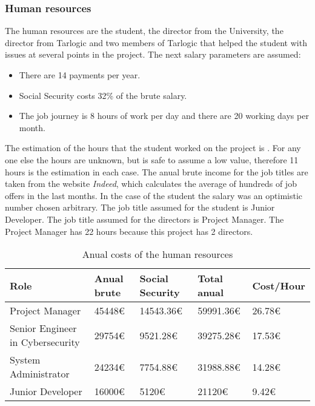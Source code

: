 \subsubsection{Human resources}
The human resources are the student, the director from the University, the director from Tarlogic and two members of Tarlogic that helped the student with issues at several points in the project.
\linej
\linej
The next salary parameters are assumed:
\begin{itemize}
	\item There are 14 payments per year.
	\item Social Security costs 32\% of the brute salary.
	\item The job journey is 8 hours of work per day and there are 20 working days per month.
\end{itemize}
\linej
The estimation of the hours that the student worked on the project is \projecthours.
For any one else the hours are unknown, but is safe to assume a low value, therefore 11 hours is the estimation in each case.
\linej
The anual brute income for the job titles are taken from the website \textit{Indeed}\cite{indeed}, which calculates the average of hundreds of job offers in the last months.
In the case of the student the salary was an optimistic number chosen arbitrary.
\linej
The job title assumed for the student is Junior Developer.
The job title assumed for the directors is Project Manager.
The Project Manager has 22 hours because this project has 2 directors.
\linej
\begin{table}[H]
	\begin{tabularx}{\textwidth}{|X|l|l|l|l|}
		\hline
		\rowcolor{gray!30}
		Role                             & Anual brute &  Social Security &    Total anual & Cost/Hour\\ \hline
		Project Manager                  & 45448\euro{}&   14543.36\euro{}& 59991.36\euro{}& 26.78\euro{}\\ \hline
		Senior Engineer in Cybersecurity & 29754\euro{}&    9521.28\euro{}& 39275.28\euro{}& 17.53\euro{}\\ \hline
		System Administrator             & 24234\euro{}&    7754.88\euro{}& 31988.88\euro{}& 14.28\euro{}\\ \hline
		Junior Developer                 & 16000\euro{}&       5120\euro{}&    21120\euro{}& 9.42\euro{}\\ \hline
	\end{tabularx}
	\caption{Anual costs of the human resources}
\end{table}
